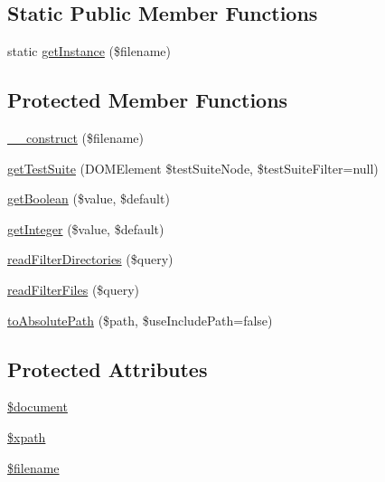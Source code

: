 \subsection*{Static Public Member Functions}
\begin{DoxyCompactItemize}
\item 
static \mbox{\hyperlink{class_p_h_p_unit___util___configuration_a13034fd6b1dcf949e6c26dc8c4e464cb}{get\+Instance}} (\$filename)
\end{DoxyCompactItemize}
\subsection*{Protected Member Functions}
\begin{DoxyCompactItemize}
\item 
\mbox{\hyperlink{class_p_h_p_unit___util___configuration_a3387125924c13e72878c47ecad75faca}{\+\_\+\+\_\+construct}} (\$filename)
\item 
\mbox{\hyperlink{class_p_h_p_unit___util___configuration_a07e38c4b4f08f2d50739562235952225}{get\+Test\+Suite}} (D\+O\+M\+Element \$test\+Suite\+Node, \$test\+Suite\+Filter=null)
\item 
\mbox{\hyperlink{class_p_h_p_unit___util___configuration_a36eca2931cea673827f30310453d2afb}{get\+Boolean}} (\$value, \$default)
\item 
\mbox{\hyperlink{class_p_h_p_unit___util___configuration_addb971651caad2302a1c1a1c1ef35857}{get\+Integer}} (\$value, \$default)
\item 
\mbox{\hyperlink{class_p_h_p_unit___util___configuration_a6ccb20f9f1158310c8fb5e3861b3cbbf}{read\+Filter\+Directories}} (\$query)
\item 
\mbox{\hyperlink{class_p_h_p_unit___util___configuration_a4a9714e2bea7d25b00ab025aeac10bd8}{read\+Filter\+Files}} (\$query)
\item 
\mbox{\hyperlink{class_p_h_p_unit___util___configuration_a1d05d18cdb4c7d80110a47c91c3c8d17}{to\+Absolute\+Path}} (\$path, \$use\+Include\+Path=false)
\end{DoxyCompactItemize}
\subsection*{Protected Attributes}
\begin{DoxyCompactItemize}
\item 
\mbox{\hyperlink{class_p_h_p_unit___util___configuration_ac5a31edb787609a3143dec9bfa8063ea}{\$document}}
\item 
\mbox{\hyperlink{class_p_h_p_unit___util___configuration_aa270f2ef637ad3d6465f2b764c046def}{\$xpath}}
\item 
\mbox{\hyperlink{class_p_h_p_unit___util___configuration_a0722441477f957078ee2437054556cbc}{\$filename}}
\end{DoxyCompactItemize}


